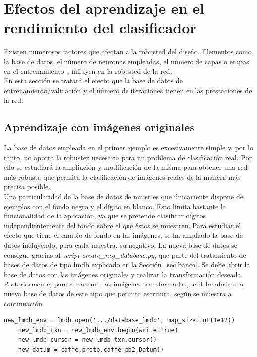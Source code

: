 \section{Efectos del aprendizaje en el rendimiento del clasificador} \label{sec.aprendizaje}
Existen numerosos factores que afectan a la robusted del diseño. Elementos como la base de datos, el número de neuronas empleadas, el número de capas o etapas en el entrenamiento~\cite{lopez2008redes}, influyen en la robusted de la red.\\

En esta sección se tratará el efecto que la base de datos de entrenamiento/validación y el número de iteraciones tienen en las prestaciones de la red.

\subsection{Aprendizaje con imágenes originales}
La base de datos empleada en el primer ejemplo es excesivamente simple y, por lo tanto, no aporta la robustez necesaria para un problema de clasificación real. Por ello se estudiará la ampliación y modificación de la misma para obtener una red más robusta que permita la clasificación de imágenes reales de la manera más precisa posible.\\

Una particularidad de la base de datos de \acrshort{mnist} es que únicamente dispone de ejemplos con el fondo negro y el dígito en blanco. Esto limita bastante la funcionalidad de la aplicación, ya que se pretende clasificar dígitos independientemente del fondo sobre el que éstos se muestren. Para estudiar el efecto que tiene el cambio de fondo en las imágenes, se ha ampliado la base de datos incluyendo, para cada muestra, su negativo. La nueva base de datos se consigue gracias al \textit{script} \textit{create\_neg\_database.py}, que parte del tratamiento de bases de datos de tipo \acrshort{lmdb} explicado en la Sección~\ref{sec.banco}. Se debe abrir la base de datos con las imágenes originales y realizar la transformación deseada. Posteriormente, para almacenar las imágenes transformadas, se debe abrir una nueva base de datos de este tipo que permita escritura, según se muestra a continuación.
\vspace{10pt}
\begin{lstlisting}[frame=single]
	new_lmdb_env = lmdb.open('.../database_lmdb', map_size=int(1e12))
	new_lmdb_txn = new_lmdb_env.begin(write=True)
	new_lmdb_cursor = new_lmdb_txn.cursor()
	new_datum = caffe.proto.caffe_pb2.Datum()
	\end{lstlisting}

